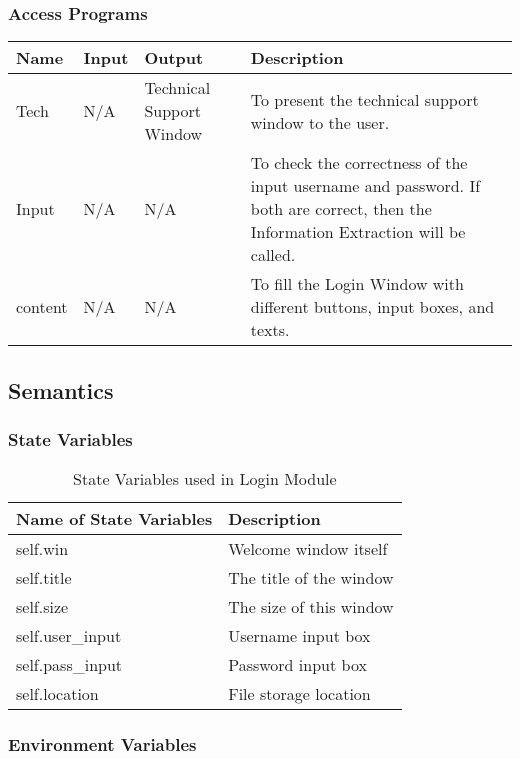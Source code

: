 \documentclass[12pt, titlepage]{article}
\begin{document}
\subsubsection{Access Programs}
\begin{center}
\begin{tabular}{|p{2cm}|p{2cm}|l|p{6cm}|}
\hline
\textbf{Name} & \textbf{Input} & \textbf{Output} & \textbf{Description}\\
\hline
Tech & N/A & Technical Support Window & To present the technical support window to the user.\\
\hline
Input & N/A & N/A & To check the correctness of the input username and password. If both are correct, then the Information Extraction will be called.\\
\hline
content & N/A & N/A & To fill the Login Window with different buttons, input boxes, and texts. \\
\hline

\end{tabular}
\end{center}

\subsection{Semantics}

\subsubsection{State Variables}

\begin{table}[H]
\caption{State Variables used in Login Module} 
\begin{tabularx}{\textwidth}{XX}
\toprule
\textbf{Name of State Variables} & \textbf{Description}\\
\midrule
self.win & Welcome window itself\\
self.title & The title of the window\\
self.size & The size of this window\\
self.user\_input & Username input box\\
self.pass\_input & Password input box\\
self.location & File storage location\\

\bottomrule
\end{tabularx}
\end{table}

\subsubsection{Environment Variables}
\end{document}
